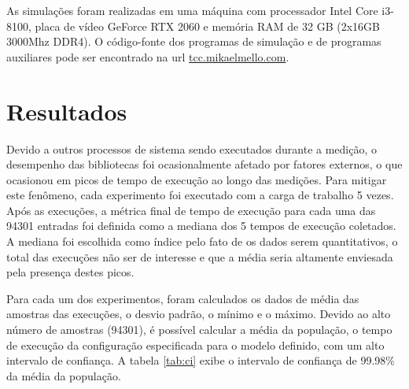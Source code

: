 As simulações foram realizadas em uma máquina com processador Intel Core i3-8100, placa de vídeo GeForce RTX 2060 e memória RAM de 32 GB (2x16GB 3000Mhz DDR4). O código-fonte dos programas de simulação e de programas auxiliares pode ser encontrado na url \url{tcc.mikaelmello.com}.

\section{Resultados}

Devido a outros processos de sistema sendo executados durante a medição, o desempenho das bibliotecas foi ocasionalmente afetado por fatores externos, o que ocasionou em picos de tempo de execução ao longo das medições. Para mitigar este fenômeno, cada experimento foi executado com a carga de trabalho 5 vezes. Após as execuções, a métrica final de tempo de execução para cada uma das 94301 entradas foi definida como a mediana dos 5 tempos de execução coletados. A mediana foi escolhida como índice pelo fato de os dados serem quantitativos, o total das execuções não ser de interesse e que a média seria altamente enviesada pela presença destes picos.

Para cada um dos experimentos, foram calculados os dados de média das amostras das execuções, o desvio padrão, o mínimo e o máximo. Devido ao alto número de amostras (94301), é possível calcular a média da população, o tempo de execução da configuração especificada para o modelo definido, com um alto intervalo de confiança. A tabela \ref{tab:ci} exibe o intervalo de confiança de 99.98\% da média da população.

